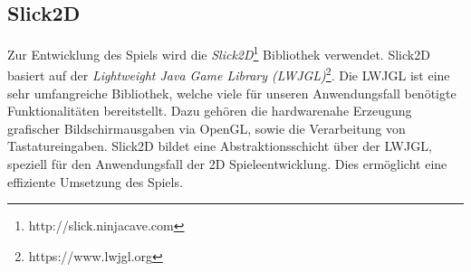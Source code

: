 \subsection{Slick2D}

Zur Entwicklung des Spiels wird die \textit{Slick2D}\footnote{http://slick.ninjacave.com} Bibliothek verwendet.
Slick2D basiert auf der \textit{Lightweight Java Game Library (LWJGL)}\footnote{https://www.lwjgl.org}.
Die LWJGL ist eine sehr umfangreiche Bibliothek, welche viele für unseren Anwendungsfall benötigte Funktionalitäten bereitstellt.
Dazu gehören die hardwarenahe Erzeugung grafischer Bildschirmausgaben via OpenGL, sowie die Verarbeitung von Tastatureingaben.
Slick2D bildet eine Abstraktionsschicht über der LWJGL, speziell für den Anwendungsfall der 2D Spieleentwicklung.
Dies ermöglicht eine effiziente Umsetzung des Spiels.